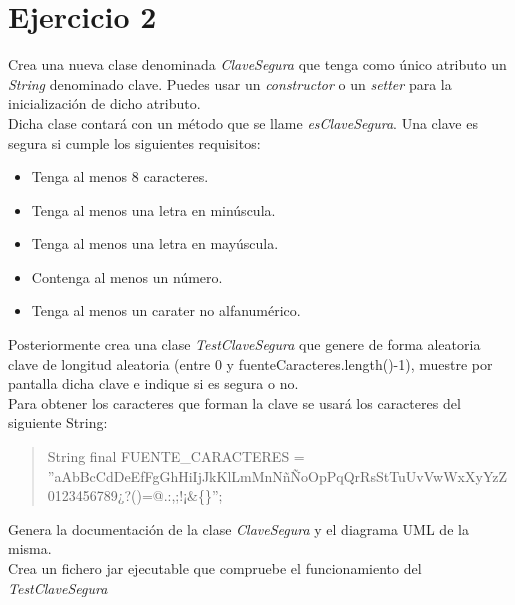 \documentclass[4paper]{article}
\begin{document}
\section*{Ejercicio 2}
Crea una nueva clase denominada \emph{ClaveSegura} que tenga como único atributo un \emph{String} denominado clave. Puedes usar un \emph{constructor} o un \emph{setter} para la inicialización de dicho atributo.\\
Dicha clase contará con un método que se llame \emph{esClaveSegura}. Una clave es segura si cumple los siguientes requisitos:
\begin{itemize}
\item Tenga al menos 8 caracteres.
\item Tenga al menos una letra en minúscula.
\item Tenga al menos una letra en mayúscula.
\item Contenga al menos un número.
\item Tenga al menos un carater no alfanumérico.
\end{itemize}
Posteriormente crea una clase \emph{TestClaveSegura} que genere de forma aleatoria clave de longitud aleatoria (entre 0 y fuenteCaracteres.length()-1), muestre por pantalla dicha clave e indique si es segura o no.\\
Para obtener los caracteres que forman la clave se usará los caracteres del siguiente String: 
\begin{verse}
String final FUENTE\_CARACTERES = ''aAbBcCdDeEfFgGhHiIjJkKlLmMnNñÑoOpPqQrRsStTuUvVwWxXyYzZ0123456789¿?()=@.:,;!¡\&\{\}'';
\end{verse}
Genera la documentación de la clase \emph{ClaveSegura} y el diagrama UML de la misma.
\\
Crea un fichero jar ejecutable que compruebe el funcionamiento del \emph{TestClaveSegura}
\end{document}
